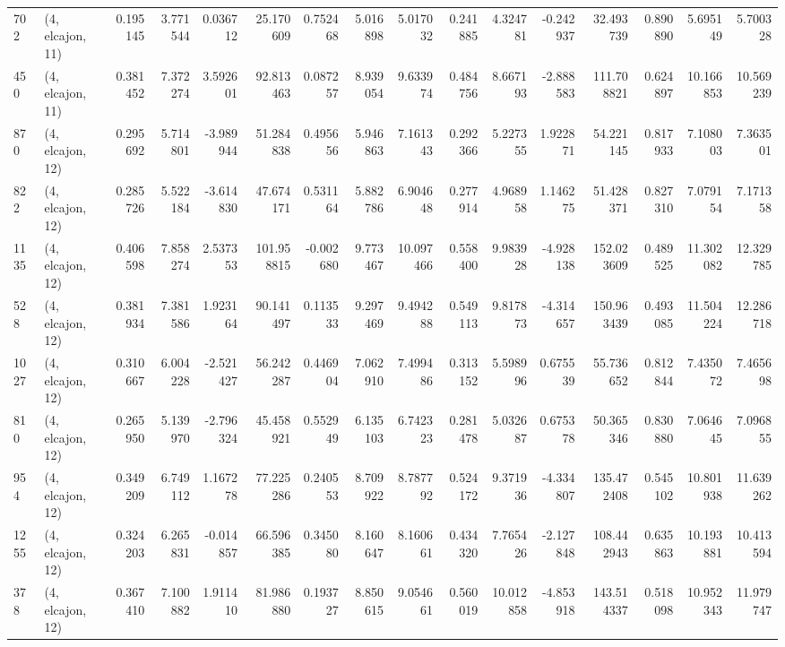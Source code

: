 \begin{tabular}{llrrrrrrrrrrrrrr}
702  &  (4, elcajon, 11) &   0.195145 &   3.771544 &   0.036712 &     25.170609 &    0.752468 &    5.016898 &    5.017032 &  0.241885 &   4.324781 &  -0.242937 &    32.493739 &   0.890890 &   5.695149 &   5.700328 \\
450  &  (4, elcajon, 11) &   0.381452 &   7.372274 &   3.592601 &     92.813463 &    0.087257 &    8.939054 &    9.633974 &  0.484756 &   8.667193 &  -2.888583 &   111.708821 &   0.624897 &  10.166853 &  10.569239 \\
870  &  (4, elcajon, 12) &   0.295692 &   5.714801 &  -3.989944 &     51.284838 &    0.495656 &    5.946863 &    7.161343 &  0.292366 &   5.227355 &   1.922871 &    54.221145 &   0.817933 &   7.108003 &   7.363501 \\
822  &  (4, elcajon, 12) &   0.285726 &   5.522184 &  -3.614830 &     47.674171 &    0.531164 &    5.882786 &    6.904648 &  0.277914 &   4.968958 &   1.146275 &    51.428371 &   0.827310 &   7.079154 &   7.171358 \\
1135 &  (4, elcajon, 12) &   0.406598 &   7.858274 &   2.537353 &    101.958815 &   -0.002680 &    9.773467 &   10.097466 &  0.558400 &   9.983928 &  -4.928138 &   152.023609 &   0.489525 &  11.302082 &  12.329785 \\
528  &  (4, elcajon, 12) &   0.381934 &   7.381586 &   1.923164 &     90.141497 &    0.113533 &    9.297469 &    9.494288 &  0.549113 &   9.817873 &  -4.314657 &   150.963439 &   0.493085 &  11.504224 &  12.286718 \\
1027 &  (4, elcajon, 12) &   0.310667 &   6.004228 &  -2.521427 &     56.242287 &    0.446904 &    7.062910 &    7.499486 &  0.313152 &   5.598996 &   0.675539 &    55.736652 &   0.812844 &   7.435072 &   7.465698 \\
810  &  (4, elcajon, 12) &   0.265950 &   5.139970 &  -2.796324 &     45.458921 &    0.552949 &    6.135103 &    6.742323 &  0.281478 &   5.032687 &   0.675378 &    50.365346 &   0.830880 &   7.064645 &   7.096855 \\
954  &  (4, elcajon, 12) &   0.349209 &   6.749112 &   1.167278 &     77.225286 &    0.240553 &    8.709922 &    8.787792 &  0.524172 &   9.371936 &  -4.334807 &   135.472408 &   0.545102 &  10.801938 &  11.639262 \\
1255 &  (4, elcajon, 12) &   0.324203 &   6.265831 &  -0.014857 &     66.596385 &    0.345080 &    8.160647 &    8.160661 &  0.434320 &   7.765426 &  -2.127848 &   108.442943 &   0.635863 &  10.193881 &  10.413594 \\
378  &  (4, elcajon, 12) &   0.367410 &   7.100882 &   1.911410 &     81.986880 &    0.193727 &    8.850615 &    9.054661 &  0.560019 &  10.012858 &  -4.853918 &   143.514337 &   0.518098 &  10.952343 &  11.979747 \\

\end{tabular}
